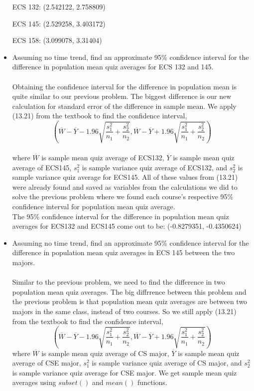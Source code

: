 \documentclass{article}
\begin{document}
\begin{itemize}
            ECS 132: (2.542122, 2.758809)
            
            ECS 145: (2.529258, 3.403172)
            
            ECS 158: (3.099078, 3.31404)
\item Assuming no time trend, find an approximate 95\% confidence interval for the difference in population mean quiz averages for ECS 132 and 145.
\\\\Obtaining the confidence interval for the difference in population mean is quite similar to our previous problem. The biggest difference is our new calculation for standard error of the difference in sample mean. We apply (13.21) from the textbook to find the confidence interval, 
            $$(\overline{W} - \overline{Y} - 1.96 \sqrt{\frac{s_1^2}{n_1} + \frac{s_2^2}{n_2}}, \overline{W} - \overline{Y} + 1.96 \sqrt{\frac{s_1^2}{n_1} + \frac{s_2^2}{n_2}})$$ \\
            where $\overline{W}$ is sample mean quiz average of ECS132, $\overline{Y}$ is sample mean quiz average of ECS145, $s_1^2$ is sample variance quiz average of ECS132, and $s_2^2$ is sample variance quiz average for ECS145. All of these values from (13.21) were already found and saved as variables from the calculations we did to solve the previous problem where we found each course's respective 95\% confidence interval for population mean quiz average. \\
            
            The 95\% confidence interval for the difference in population mean quiz averages for ECS132 and ECS145 come out to be: (-0.8279351, -0.4350624)

        
\item Assuming no time trend, find an approximate 95\% confidence interval for the difference in population mean quiz averages in ECS 145 between the two majors.
\\\\ Similar to the previous problem, we need to find the difference in two population mean quiz averages. The big diffrrence between this problem and the previous problem is that population mean quiz averages are between two majors in the same class, instead of two courses. So we still apply (13.21) from the textbook to find the confidence interval,
            $$(\overline{W} - \overline{Y} - 1.96 \sqrt{\frac{s_1^2}{n_1} + \frac{s_2^2}{n_2}}, \overline{W} - \overline{Y} + 1.96 \sqrt{\frac{s_1^2}{n_1} + \frac{s_2^2}{n_2}})$$
            where $\overline{W}$ is sample mean quiz average of CS major, $\overline{Y}$ is sample mean quiz average of CSE major, $s_1^2$ is sample variance quiz average of CS major, and $s_2^2$ is sample variance quiz average for CSE major. We get sample mean quiz averages using $subset()$ and $mean()$ functions.\\
            

\end{itemize}
\end{document}
